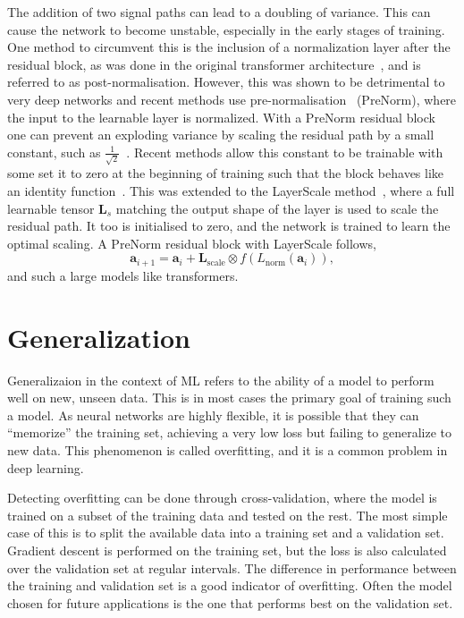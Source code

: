 The addition of two signal paths can lead to a doubling of variance.
This can cause the network to become unstable, especially in the early stages of training.
One method to circumvent this is the inclusion of a normalization layer after the residual block, as was done in the original transformer architecture~\cite{Attention}, and is referred to as post-normalisation.
However, this was shown to be detrimental to very deep networks and recent methods use pre-normalisation~\cite{PreLN} (PreNorm), where the input to the learnable layer is normalized.
With a PreNorm residual block one can prevent an exploding variance by scaling the residual path by a small constant, such as $\frac{1}{\sqrt{2}}$~\cite{StyleGAN2}.
Recent methods allow this constant to be trainable with some set it to zero at the beginning of training such that the block behaves like an identity function~\cite{ReZero, SkipInit, Fixup}.
This was extended to the LayerScale method~\cite{GoingDeeper}, where a full learnable tensor $\mathbf{L}_s$ matching the output shape of the layer is used to scale the residual path.
It too is initialised to zero, and the network is trained to learn the optimal scaling.
A PreNorm residual block with LayerScale follows,
\begin{equation}
    \mathbf{a}_{i+1} = \mathbf{a}_i + \mathbf{L}_\text{scale} \otimes f( L_{\text{norm}}(\mathbf{a}_i) ),
\end{equation}
and such a large models like transformers.

\section{Generalization}

Generalizaion in the context of ML refers to the ability of a model to perform well on new, unseen data.
This is in most cases the primary goal of training such a model.
As neural networks are highly flexible, it is possible that they can ``memorize'' the training set, achieving a very low loss but failing to generalize to new data.
This phenomenon is called overfitting, and it is a common problem in deep learning.

Detecting overfitting can be done through cross-validation, where the model is trained on a subset of the training data and tested on the rest.
The most simple case of this is to split the available data into a training set and a validation set.
Gradient descent is performed on the training set, but the loss is also calculated over the validation set at regular intervals.
The difference in performance between the training and validation set is a good indicator of overfitting.
Often the model chosen for future applications is the one that performs best on the validation set.

